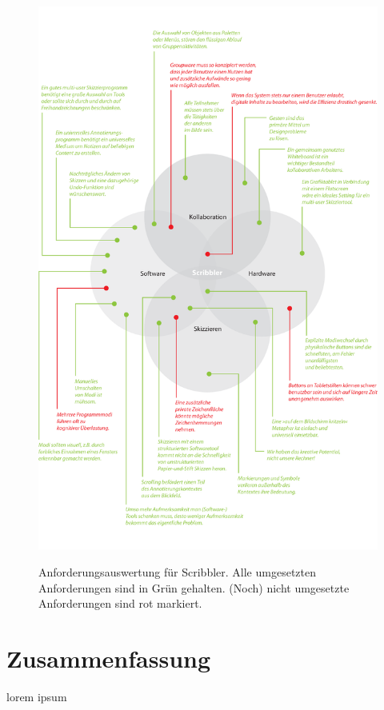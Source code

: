 \begin{figure}
	        {\includegraphics[bb=0cm 0cm 14.39cm 23.01cm]{gfx/scribblerAnforderungsauswertung}}
		\caption[Anforderungsauswertung für Scribbler]{Anforderungsauswertung für Scribbler. Alle umgesetzten Anforderungen sind in Grün gehalten. (Noch) nicht umgesetzte Anforderungen sind rot markiert.}\label{fig:scribblerAnforderungsauswertung}
\end{figure}

\section*{Zusammenfassung}
lorem ipsum